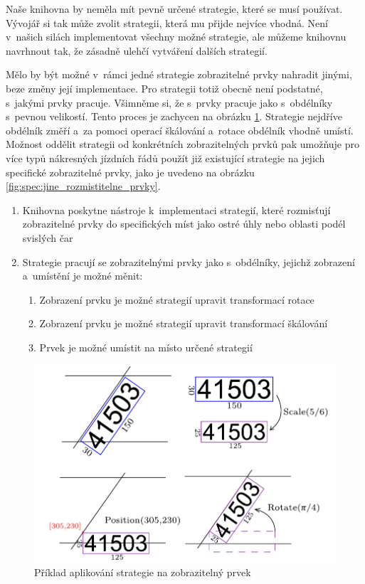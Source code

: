 Naše knihovna by neměla mít pevně určené strategie, které se musí používat. Vývojář si tak může zvolit strategii, která mu přijde nejvíce vhodná. Není v~našich silách implementovat všechny možné strategie, ale můžeme knihovnu navrhnout tak, že zásadně ulehčí vytváření dalších strategií. 

Mělo by být možné v~rámci jedné strategie zobrazitelné prvky nahradit jinými, beze změny její implementace. Pro strategii totiž obecně není podstatné, s~jakými prvky pracuje. Všimněme si, že s~prvky pracuje jako s~obdélníky s~pevnou velikostí. Tento proces je zachycen na obrázku \ref{fig:pouziti_strategie}. Strategie nejdříve obdélník změří a~za pomoci operací škálování a~rotace obdélník vhodně umístí. Možnost oddělit strategii od konkrétních zobrazitelných prvků pak umožňuje pro více typů nákresných jízdních řádů použít již existující strategie na jejich specifické zobrazitelné prvky, jako je uvedeno na obrázku \ref{fig:spec:jine_rozmistitelne_prvky}.

\newpage
\begin{enumerate}[label=\color{reqcolor}\textbf{R{\arabic*}},resume]
	\item \label{spec:req:strategie1} Knihovna poskytne nástroje k~implementaci strategií, které rozmisťují zobrazitelné prvky do specifických míst jako ostré úhly nebo oblasti podél svislých čar
	\item \label{spec:req:strategie2} Strategie pracují se zobrazitelnými prvky jako s~obdélníky, jejichž zobrazení a~umístění je možné měnit:
	\begin{enumerate}
		\item Zobrazení prvku je možné strategií upravit transformací rotace
		\item Zobrazení prvku je možné strategií upravit transformací škálování
		\item Prvek je možné umístit na místo určené strategií
	\end{enumerate}
\end{enumerate}

\begin{figure}[!hbt]
	\includegraphics[width=\textwidth]{../img/kap2_strategy_application}
	\caption{Příklad aplikování strategie na zobrazitelný prvek}
	\label{fig:pouziti_strategie}
\end{figure}

